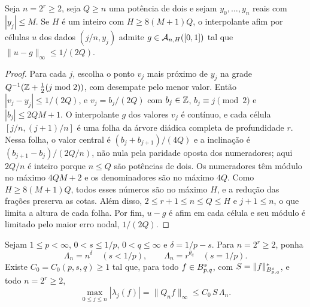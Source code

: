 \documentclass[12pt,a4paper]{article}
\begin{document}
\begin{lema}
\label{lp:lem:nodal-general}
Seja $n=2^r\ge2$, seja $Q\ge n$ uma potência de dois e sejam $y_0,\ldots,y_n$ reais com $|y_j|\le M$. Se $H$ é um inteiro com $H\ge8(M+1)Q$, o interpolante afim por células $u$ dos dados $(j/n,y_j)$ admite $g\in\mathcal A_{n,H}([0,1])$ tal que $\|u-g\|_\infty\le1/(2Q)$.
\end{lema}

\begin{proof}
Para cada $j$, escolha o ponto $v_j$ mais próximo de $y_j$ na grade $Q^{-1}(\mathbb Z+\tfrac12(j\bmod2))$, com desempate pelo menor valor. Então $|v_j-y_j|\le1/(2Q)$, e $v_j=b_j/(2Q)$ com $b_j\in\mathbb Z$, $b_j\equiv j\pmod2$ e $|b_j|\le2QM+1$. O interpolante $g$ dos valores $v_j$ é contínuo, e cada célula $[j/n,(j+1)/n]$ é uma folha da árvore diádica completa de profundidade $r$. Nessa folha, o valor central é $(b_j+b_{j+1})/(4Q)$ e a inclinação é $(b_{j+1}-b_j)/(2Q/n)$, não nula pela paridade oposta dos numeradores; aqui $2Q/n$ é inteiro porque $n\le Q$ são potências de dois. Os numeradores têm módulo no máximo $4QM+2$ e os denominadores são no máximo $4Q$. Como $H\ge8(M+1)Q$, todos esses números são no máximo $H$, e a redução das frações preserva as cotas. Além disso, $2\le r+1\le n\le Q\le H$ e $j+1\le n$, o que limita a altura de cada folha. Por fim, $u-g$ é afim em cada célula e seu módulo é limitado pelo maior erro nodal, $1/(2Q)$.
\end{proof}

\begin{lema}
\label{lp:lem:sup-bound}
Sejam $1\le p<\infty$, $0<s\le1/p$, $0<q\le\infty$ e $\delta=1/p-s$. Para $n=2^r\ge2$, ponha
\[
 \Lambda_n=n^{\delta}\quad(s<1/p),\qquad \Lambda_n=r^{\theta_q}\quad(s=1/p).
\]
Existe $C_0=C_0(p,s,q)\ge1$ tal que, para todo $f\in B^{s}_{p,q}$, com $S=\|f\|^*_{B^{s}_{p,q}}$, e todo $n=2^r\ge2$,
\[
 \max_{0\le j\le n}|\lambda_j(f)|=\|Q_nf\|_\infty\le C_0\,S\,\Lambda_n .
\]
\end{lema}
\end{document}
